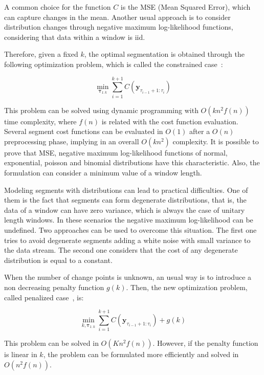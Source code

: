 A common choice for the function $C$ is the MSE (Mean Squared Error), which can capture changes in the mean. Another usual approach is to consider distribution changes through negative maximum log-likelihood functions, considering that data within a window is iid. 

Therefore, given a fixed $k$, the optimal segmentation is obtained through the following optimization problem, which is called the constrained case~\cite{on_optimal_multiple_changepoint_algorithms_for_large_data}: 

\begin{equation}
    \min_{\boldsymbol \tau_{1 : k}} \sum \limits_{i = 1}^{k + 1} C(\mathbf{y}_{\tau_{i - 1} + 1 : \tau_{i}})
\end{equation}

This problem can be solved using dynamic programming with $O(k n^2 f(n))$ time complexity, where $f(n)$ is related with the cost function evaluation. Several segment cost functions can be evaluated in $O(1)$ after a $O(n)$ preprocessing phase, implying in an overall $O(k n^2)$ complexity. It is possible to prove that MSE, negative maximum log-likelihood functions of normal, exponential, poisson and binomial distributions have this characteristic. Also, the formulation can consider a minimum value of a window length.

Modeling segments with distributions can lead to practical difficulties. One of them is the fact that segments can form degenerate distributions, that is, the data of a window can have zero variance, which is always the case of unitary length windows. In these scenarios the negative maximum log-likelihood can be undefined. Two approaches can be used to overcome this situation. The first one tries to avoid degenerate segments adding a white noise with small variance to the data stream. The second one considers that the cost of any degenerate distribution is equal to a constant.

When the number of change points is unknown, an usual way is to introduce a non decreasing penalty function $g(k)$. Then, the new optimization problem, called penalized case~\cite{on_optimal_multiple_changepoint_algorithms_for_large_data}, is:

\begin{equation}
    \min_{k, \boldsymbol \tau_{1 : k}} \sum \limits_{i = 1}^{k + 1} C(\mathbf{y}_{\tau_{i - 1} + 1 : \tau_{i}}) + g(k)
\end{equation}

This problem can be solved in $O(K n^{2} f(n))$. However, if the penalty function is linear in $k$, the problem can be formulated more efficiently and solved in $O(n^{2} f(n))$.

